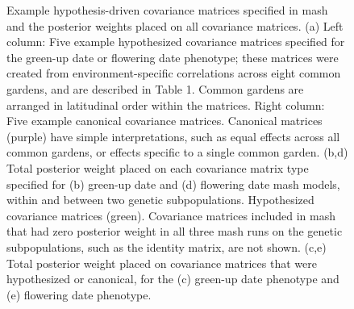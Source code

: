 \documentclass[
  9pt,
  twocolumn,
  twoside]{pnas-new}
\begin{document}
\begin{figure}


\caption{\label{fig-covar}Example hypothesis-driven covariance matrices
specified in mash and the posterior weights placed on all covariance
matrices. (a) Left column: Five example hypothesized covariance matrices
specified for the green-up date or flowering date phenotype; these
matrices were created from environment-specific correlations across
eight common gardens, and are described in Table 1. Common gardens are
arranged in latitudinal order within the matrices. Right column: Five
example canonical covariance matrices. Canonical matrices (purple) have
simple interpretations, such as equal effects across all common gardens,
or effects specific to a single common garden. (b,d) Total posterior
weight placed on each covariance matrix type specified for (b) green-up
date and (d) flowering date mash models, within and between two genetic
subpopulations. Hypothesized covariance matrices (green). Covariance
matrices included in mash that had zero posterior weight in all three
mash runs on the genetic subpopulations, such as the identity matrix,
are not shown. (c,e) Total posterior weight placed on covariance
matrices that were hypothesized or canonical, for the (c) green-up date
phenotype and (e) flowering date phenotype.}

\end{figure}%
\end{document}
